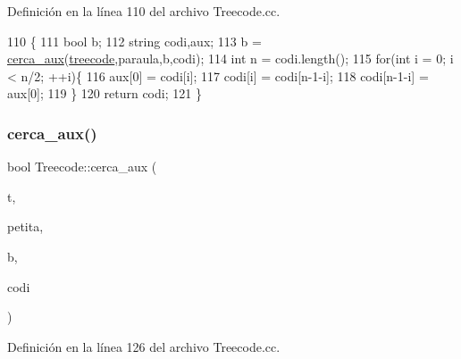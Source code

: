 Definición en la línea 110 del archivo Treecode.\+cc.


\begin{DoxyCode}
110                                                     \{
111     \textcolor{keywordtype}{bool} b;
112     \textcolor{keywordtype}{string} codi,aux;
113     b = \hyperlink{class_treecode_ac320d8634179b2ab24dc89bd706264ca}{cerca\_aux}(\hyperlink{class_treecode_abd4467b0a13a57fcd3bddf4a60853372}{treecode},paraula,b,codi);
114     \textcolor{keywordtype}{int} n = codi.length();
115     \textcolor{keywordflow}{for}(\textcolor{keywordtype}{int} i = 0; i < n/2; ++i)\{
116         aux[0] = codi[i];
117         codi[i] = codi[n-1-i];
118         codi[n-1-i] = aux[0];
119     \}
120     \textcolor{keywordflow}{return} codi;
121 \}
\end{DoxyCode}
\mbox{\label{class_treecode_ac320d8634179b2ab24dc89bd706264ca}} 
\subsubsection{\texorpdfstring{cerca\+\_\+aux()}{cerca\_aux()}}
{\footnotesize\ttfamily bool Treecode\+::cerca\+\_\+aux (\begin{DoxyParamCaption}\item[{const Bin\+Tree$<$ pair$<$ string, int $>$ $>$ \&}]{t,  }\item[{const string \&}]{petita,  }\item[{bool \&}]{b,  }\item[{string \&}]{codi }\end{DoxyParamCaption})}



Definición en la línea 126 del archivo Treecode.\+cc.



